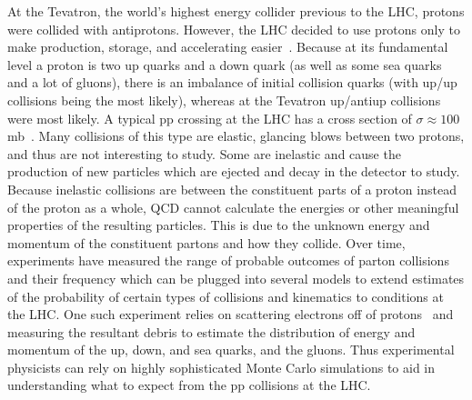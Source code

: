 At the Tevatron, the world's highest energy collider previous to the LHC, protons were collided with antiprotons. However, the LHC decided to use protons only to make production, storage, and accelerating easier~\cite{lhcmachine}. Because at its fundamental level a proton is two up quarks and a down quark (as well as some sea quarks and a lot of gluons), there is an imbalance of initial collision quarks (with up/up collisions being the most likely), whereas at the Tevatron up/antiup collisions were most likely. A typical pp crossing at the LHC has a cross section of $\sigma \approx 100$ mb~\cite{qcdprimer}. Many collisions of this type are elastic, glancing blows between two protons, and thus are not interesting to study. Some are inelastic and cause the production of new particles which are ejected and decay in the detector to study. Because inelastic collisions are between the constituent parts of a proton instead of the proton as a whole, QCD cannot calculate the energies or other meaningful properties of the resulting particles. This is due to the unknown energy and momentum of the constituent partons and how they collide. Over time, experiments have measured the range of probable outcomes of parton collisions and their frequency which can be plugged into several models to extend estimates of the probability of certain types of collisions and kinematics to conditions at the LHC. One such experiment relies on scattering electrons off of protons~\cite{halzen} and measuring the resultant debris to estimate the distribution of energy and momentum of the up, down, and sea quarks, and the gluons. Thus experimental physicists can rely on highly sophisticated Monte Carlo simulations to aid in understanding what to expect from the pp collisions at the LHC.



